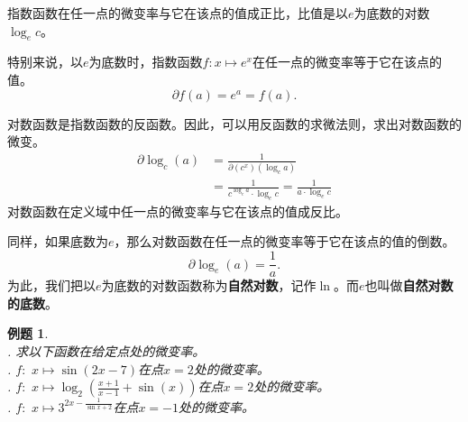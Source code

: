 \documentclass[12pt,UTF8]{ctexbook}
\newtheorem{et}{例题}[section]
\begin{document}
指数函数在任一点的微变率与它在该点的值成正比，比值是以$e$为底数的对数$\log_e{c}$。

特别来说，以$e$为底数时，指数函数$f: x\mapsto e^x$在任一点的微变率等于它在该点的值。
$$ \partial f (a) = e^a = f(a).$$

对数函数是指数函数的反函数。因此，可以用反函数的求微法则，求出对数函数的微变。
\begin{align*}
    \partial \log_c (a) &= \frac{1}{\partial (c^x) (\log_c{a})}  \\
    &= \frac{1}{c^{\log_c{a}} \cdot \log_e{c}} = \frac{1}{a \cdot \log_e{c}}   
\end{align*}
对数函数在定义域中任一点的微变率与它在该点的值成反比。

同样，如果底数为$e$，那么对数函数在任一点的微变率等于它在该点的值的倒数。
$$ \partial \log_e (a) = \frac{1}{a}.$$
为此，我们把以$e$为底数的对数函数称为\textbf{自然对数}，记作$\ln$。而$e$也叫做\textbf{自然对数的底数}。

\begin{et}
    \mbox{} \\
    . 求以下函数在给定点处的微变率。\\
    . $f: \,\, x \mapsto \sin{(2x - 7)}$在点$x = 2$处的微变率。\\
    . $f: \,\, x \mapsto \log_2{\left(\frac{x+1}{x-1} + \sin(x)\right)}$在点$x = 2$处的微变率。\\
    . $f: \,\, x \mapsto 3^{2x - \frac{1}{\sin{x} + 2}}$在点$x = -1$处的微变率。\\
\end{et}
\end{document}
